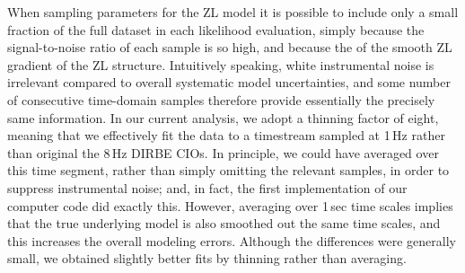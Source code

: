 \documentclass[twocolumn]{aa}
\begin{document}

When sampling parameters for the ZL model it is possible to include only a
small fraction of the full dataset in each likelihood evaluation,
simply because the signal-to-noise ratio of each sample is so high,
and because the of the smooth ZL gradient of the ZL
structure. Intuitively speaking, white instrumental noise is
irrelevant compared to overall systematic model uncertainties, and
some number of consecutive time-domain samples therefore provide
essentially the precisely same information. In our current analysis,
we adopt a thinning factor of eight, meaning that we effectively fit
the data to a timestream sampled at 1\,Hz rather than original the
8\,Hz DIRBE CIOs. In principle, we could have averaged over this time
segment, rather than simply omitting the relevant samples, in order to
suppress instrumental noise; and, in fact, the first implementation of
our computer code did exactly this. However, averaging over 1\,sec
time scales implies that the true underlying model is also smoothed
out the same time scales, and this increases the overall modeling
errors. Although the differences were generally small, we obtained
slightly better fits by thinning rather than averaging.

\end{document}
